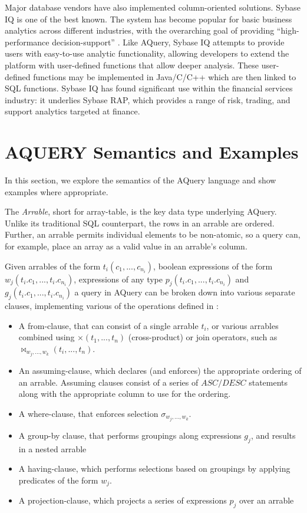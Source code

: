 \documentclass{acm_proc_article-sp}
\begin{document}
Major database vendors have also implemented column-oriented solutions. Sybase IQ is one of the best known. The system has become popular for basic business analytics across different industries, with the overarching goal of providing ``high-performance decision-support''\cite{sybase_iq16_manual} .  Like AQuery, Sybase IQ attempts to provide users 
with easy-to-use analytic functionality, 
allowing developers to extend the platform with user-defined functions that allow deeper analysis. These user-defined functions 
may be implemented in Java/C/C++\cite{sybase_iq_udf} which 
are then linked to SQL functions. Sybase IQ has found significant use within the financial services industry: it underlies Sybase RAP,  which provides a range of risk, trading, and support analytics targeted at finance\cite{sybase_rap}.


\section{AQUERY Semantics and Examples}
In this section, we explore the semantics of the AQuery language and show examples where appropriate.


 The {\em Arrable}, short for array-table, is the key data type underlying AQuery. Unlike its traditional SQL counterpart\cite{codd1970relational}, the rows in an arrable are ordered. 
Further, an arrable permits individual elements to be non-atomic, so 
a query can, for example, place an array as a valid value 
in an arrable's column.

Given arrables of the form $t_i(c_1, ..., c_{n_i})$, boolean expressions of the form $w_j(t_i.c_1, ..., t_i.c_{n_i})$,  expressions of any type $p_j(t_i.c_1, ..., t_i.c_{n_i})$ and $g_j(t_i.c_1, ..., t_i.c_{n_i})$ a query in AQuery can be broken down into various separate clauses, implementing various of the operations defined in \cite{lerner-thesis}:
 \begin{itemize}
  \item A from-clause, that can consist of a single arrable $t_i$, or various arrables combined using $\times (t_1, ..., t_n)$ (cross-product) or join operators, such as $\bowtie_{w_j,...,w_k}(t_i, ..., t_n)$.
   \item An assuming-clause, which declares (and enforces) the appropriate ordering of an arrable. Assuming clauses consist of a series of $ASC/DESC$ statements along with the appropriate column to use for the ordering.
  \item A where-clause, that enforces selection $\sigma_{w_j, ..., w_k}$.
  \item A group-by clause, that performs groupings along expressions $g_j$, and results in a nested arrable
  \item A having-clause, which performs selections based on groupings by applying predicates of the form $w_j$.
  \item A projection-clause, which projects a series of expressions $p_j$ over an arrable
 \end{itemize}
 
\end{document}
